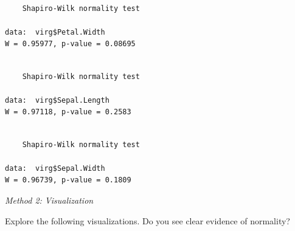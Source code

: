 \documentclass[
  letterpaper,
  DIV=11,
  numbers=noendperiod]{scrartcl}
\newenvironment{Shaded}{\begin{snugshade}}{\end{snugshade}}
\newcommand{\CommentTok}[1]{\textcolor[rgb]{0.37,0.37,0.37}{#1}}
\newcommand{\FunctionTok}[1]{\textcolor[rgb]{0.28,0.35,0.67}{#1}}
\newcommand{\NormalTok}[1]{\textcolor[rgb]{0.00,0.23,0.31}{#1}}
\newcommand{\SpecialCharTok}[1]{\textcolor[rgb]{0.37,0.37,0.37}{#1}}
\begin{document}
\begin{verbatim}

    Shapiro-Wilk normality test

data:  virg$Petal.Width
W = 0.95977, p-value = 0.08695
\end{verbatim}

\begin{Shaded}
\end{Shaded}

\begin{verbatim}

    Shapiro-Wilk normality test

data:  virg$Sepal.Length
W = 0.97118, p-value = 0.2583
\end{verbatim}

\begin{Shaded}
\end{Shaded}

\begin{verbatim}

    Shapiro-Wilk normality test

data:  virg$Sepal.Width
W = 0.96739, p-value = 0.1809
\end{verbatim}

\hfill\break
\emph{Method 2: Visualization}

Explore the following visualizations. Do you see clear evidence of
normality?
\end{document}
